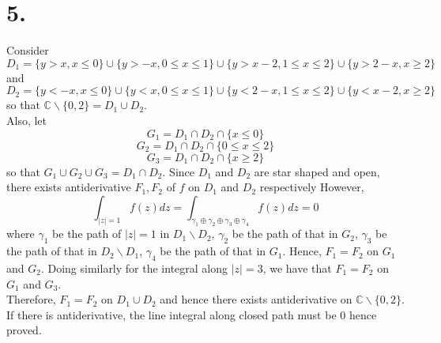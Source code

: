 \documentclass[11pt]{article}
\begin{document}
\section*{5.}
Consider 
\[
    D_1 = \{ y > x, x \le 0 \} \cup \{y > -x, 0\le x\le 1\} \cup \{y>x-2, 1\le x\le 2\} \cup \{y>2-x, x\ge 2\}
\]
and 
\[
    D_2 = \{y < -x, x\le 0\} \cup \{y < x, 0\le x\le 1\} \cup \{y< 2-x, 1 \le x\le 2\} \cup \{y<x-2, x\ge 2\}    
\]
so that $\mathbb{C} \backslash \{0,2\} = D_1 \cup D_2$.  \\
Also, let 
\[
    G_1 = D_1 \cap D_2 \cap \{x \le 0\}    
\]
\[
    G_2 = D_1 \cap D_2 \cap \{0\le x \le 2\}    
\]
\[
    G_3 = D_1 \cap D_2 \cap \{x \ge 2\}    
\]
so that $G_1 \cup G_2 \cup G_3 = D_1 \cap D_2$.
Since $D_1$ and $D_2$ are star shaped and open, there exists antiderivative $F_1, F_2$ of $f$ on $D_1$ and $D_2$ respectively
However, 
\[
    \int_{|z| = 1} f(z)dz = \int_{\gamma_1 \oplus \gamma_2 \oplus \gamma_3 \oplus \gamma_4} f(z) dz = 0    
\]
where $\gamma_1$ be the path of $|z| = 1$ in $D_1\backslash D_2$, $\gamma_2$ be the path of that in $G_2$, $\gamma_3$ be the path of that in $D_2 \backslash D_1$, $\gamma_4$ be the path of that in $G_1$.
Hence, $F_1=F_2$ on $G_1$ and $G_2$. Doing similarly for the integral along $|z| = 3$, we have that $F_1 = F_2$ on $G_1$ and $G_3$. \\
Therefore, $F_1 = F_2$ on $D_1 \cup D_2$ and hence there exists antiderivative on $\mathbb{C} \backslash \{0,2\}$. \\
If there is antiderivative, the line integral along closed path must be 0 hence proved.
\end{document}
